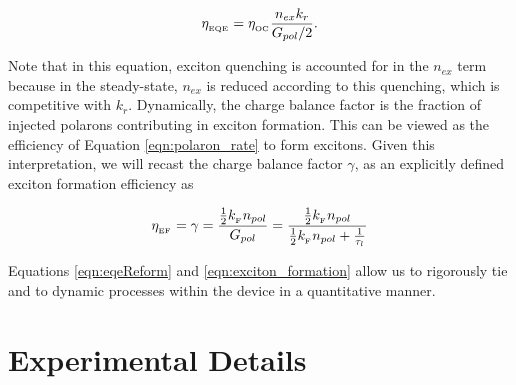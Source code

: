 \documentclass[../thesis.tex]{subfiles}
\begin{document}
\begin{equation}
\eta_{_\text{\tiny EQE}}=\eta_{_\text{\tiny OC}} \frac{n_{ex}k_r}{G_{pol}/2}.
\label{eqn:eqeReform}
\end{equation}

Note that in this equation, exciton quenching is accounted for in the $n_{ex}$ term because in the steady-state, $n_{ex}$ is reduced according to this quenching, which is competitive with $k_r$.
Dynamically, the charge balance factor is the fraction of injected polarons contributing in exciton formation.  
This can be viewed as the efficiency of Equation \ref{eqn:polaron_rate} to form excitons.
Given this interpretation, we will recast the charge balance factor $\gamma$, as an explicitly defined exciton formation efficiency \ef as

\begin{equation}
\eta_{_\text{\tiny EF}}=\gamma = \frac{\frac{1}{2}k_{_\text{\tiny F}} n_{pol}}{G_{pol}}=\frac{\frac{1}{2}k_{_\text{\tiny F}} n_{pol}}{\frac{1}{2}k_{_\text{\tiny F}} n_{pol}+\frac{1}{\tau_l}}
\label{eqn:exciton_formation_polarons}
\end{equation}

Equations \ref{eqn:eqeReform} and \ref{eqn:exciton_formation} allow us to rigorously tie \eqe and \ef to dynamic processes within the device in a quantitative manner.

\section{Experimental Details} \label{sec:experimental_details}
\end{document}
